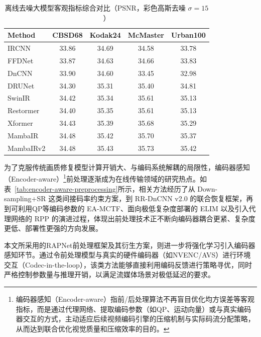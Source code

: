 \begin{table}[htbp]
  \centering
  \caption{离线去噪大模型客观指标综合对比（PSNR，彩色高斯去噪 $\sigma=15$）}
  \label{tab:offline-denoise}
  \small
  \begin{tabular}{lcccc}
    \toprule
    \textbf{Method} & \textbf{CBSD68} & \textbf{Kodak24} & \textbf{McMaster} & \textbf{Urban100} \\
    \midrule
    IRCNN       & 33.86 & 34.69 & 34.58 & 33.78 \\
    FFDNet      & 33.87 & 34.63 & 34.66 & 33.83 \\
    DnCNN\cite{Zhang2017DnCNN}       & 33.90 & 34.60 & 33.45 & 32.98 \\
    DRUNet      & 34.30 & 35.31 & 35.40 & 34.81 \\
    SwinIR      & 34.42 & 35.34 & 35.61 & 35.13 \\
    Restormer   & 34.40 & 35.35 & 35.61 & 35.13 \\
    Xformer     & 34.43 & 35.39 & 35.68 & 35.29 \\
    MambaIR     & 34.48 & 35.42 & 35.70 & 35.37 \\
    MambaIRv2   & 34.48 & 35.43 & 35.73 & 35.42 \\
    \bottomrule
  \end{tabular}
\end{table}

为了克服传统画质修复模型计算开销大、与编码系统解耦的局限性，编码器感知（Encoder-aware）\footnote{编码器感知（Encoder-aware）指前/后处理算法不再盲目优化均方误差等客观指标，而是通过代理网络、提取编码参数（如QP、运动向量）或与真实编码器交互的方式，主动适应后续视频编码引擎的压缩机制与实际码流分配策略，从而达到联合优化视觉质量和压缩效率的目的。}前处理逐渐成为在线传输领域的研究热点。如表~\ref{tab:encoder-aware-preprocessing}所示，相关方法经历了从 Down-sampling+SR\cite{ref9-shen2011downsampling} 这类间接码率约束方案，到 RR-DnCNN v2.0\cite{ref5-ho2021rrdncnn} 的联合恢复框架，再到可利用QP等编码参数的 EA-MCTF\cite{ref12-vanam2023dcc}、面向极低复杂度部署的 ELIM\cite{ref13-wang2024elim} 以及引入代理网络的 RPP\cite{ref17-ma2023rateperception} 的演进过程，体现出前处理技术正不断向编码器耦合更紧、复杂度更低、部署性更强的方向发展。


本文所采用的RAPNet前处理框架及其衍生方案，则进一步将强化学习引入编码器感知环节。通过令前处理模型与真实的硬件编码器（如NVENC/AVS）进行环境交互（Codec-in-the-loop），该类方法能够直接利用编码反馈进行策略寻优，同时严格控制参数量与推理开销，以满足流媒体场景对极低延迟的要求。

